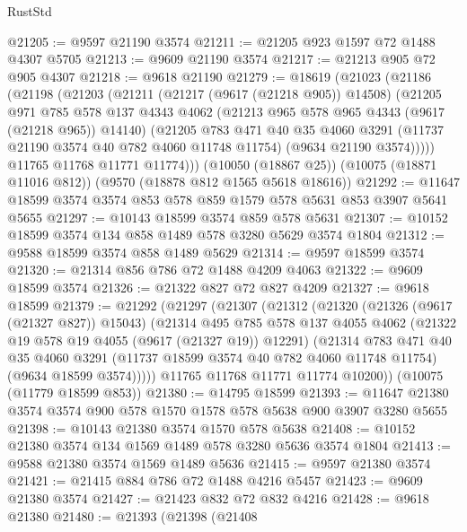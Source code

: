 \begin{lexlean}{RustStd}
\begin{coremodule}
@21205 := @9597 @21190 @3574
@21211 := @21205 @923 @1597 @72 @1488 @4307 @5705
@21213 := @9609 @21190 @3574
@21217 := @21213 @905 @72 @905 @4307
@21218 := @9618 @21190
@21279 := @18619
    (@21023
      (@21186
        (@21198
          (@21203
            (@21211
              (@21217 (@9617 (@21218 @905)) @14508)
              (@21205
                @971
                @785
                @578
                @137
                @4343
                @4062
                (@21213 @965 @578 @965 @4343 (@9617 (@21218 @965)) @14140)
                (@21205
                  @783
                  @471
                  @40
                  @35
                  @4060
                  @3291
                  (@11737 @21190 @3574 @40 @782 @4060 @11748 @11754)
                  (@9634 @21190 @3574)))))
          @11765
          @11768
          @11771
          @11774)))
    (@10050 (@18867 @25))
    (@10075 (@18871 @11016 @812))
    (@9570 (@18878 @812 @1565 @5618 @18616))
@21292 := @11647 @18599 @3574 @3574 @853 @578 @859 @1579 @578 @5631 @853 @3907 @5641 @5655
@21297 := @10143 @18599 @3574 @859 @578 @5631
@21307 := @10152 @18599 @3574 @134 @858 @1489 @578 @3280 @5629 @3574 @1804
@21312 := @9588 @18599 @3574 @858 @1489 @5629
@21314 := @9597 @18599 @3574
@21320 := @21314 @856 @786 @72 @1488 @4209 @4063
@21322 := @9609 @18599 @3574
@21326 := @21322 @827 @72 @827 @4209
@21327 := @9618 @18599
@21379 := @21292
    (@21297
      (@21307
        (@21312
          (@21320
            (@21326 (@9617 (@21327 @827)) @15043)
            (@21314
              @495
              @785
              @578
              @137
              @4055
              @4062
              (@21322 @19 @578 @19 @4055 (@9617 (@21327 @19)) @12291)
              (@21314
                @783
                @471
                @40
                @35
                @4060
                @3291
                (@11737 @18599 @3574 @40 @782 @4060 @11748 @11754)
                (@9634 @18599 @3574)))))
        @11765
        @11768
        @11771
        @11774
        @10200))
    (@10075 (@11779 @18599 @853))
@21380 := @14795 @18599
@21393 := @11647 @21380 @3574 @3574 @900 @578 @1570 @1578 @578 @5638 @900 @3907 @3280 @5655
@21398 := @10143 @21380 @3574 @1570 @578 @5638
@21408 := @10152 @21380 @3574 @134 @1569 @1489 @578 @3280 @5636 @3574 @1804
@21413 := @9588 @21380 @3574 @1569 @1489 @5636
@21415 := @9597 @21380 @3574
@21421 := @21415 @884 @786 @72 @1488 @4216 @5457
@21423 := @9609 @21380 @3574
@21427 := @21423 @832 @72 @832 @4216
@21428 := @9618 @21380
@21480 := @21393
    (@21398
      (@21408

\end{coremodule}
\end{lexlean}
